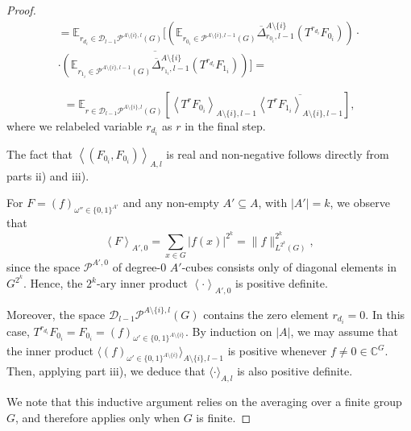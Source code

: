 \documentclass{amsart}
\theoremstyle{definition}
\theoremstyle{remark}
\numberwithin{equation}{section}
\begin{document}
\begin{proof}
\begin{multline*}
= \mathbb{E}_{r_{d_i} \in  \mathcal{D}_{l-1}\mathcal{P}^{A \setminus \{i\},l}(G) } \bigg[ \left(\mathbb{E}_{r_{0_i} \in  \mathcal{P}^{A \setminus \{i\},l-1}(G)} \overline{\Delta}^{A\setminus \{i\}}_{r_{0_i},l-1}\left( T^{r_{d_i}}F_{0_i}\right)\right) \cdot \\ \cdot
\overline{ \left(\mathbb{E}_{r_{1_i} \in  \mathcal{P}^{A \setminus \{i\},l-1}(G)}  \overline{\Delta}^{A\setminus \{i\}}_{r_{1_i},l-1}\left( T^{r_{d_i}}F_{1_i}\right)\right)} \bigg]=
\end{multline*}

$$=\mathbb{E}_{r \in \mathcal{D}_{l-1}\mathcal{P}^{A \setminus \{i\},l}(G)} \left[ \left\langle   T^{r}F_{0_i} \right\rangle_{A\setminus\{i\},l-1}  \overline{ \left\langle   T^{r}F_{1_i}  \right\rangle_{A\setminus\{i\},l-1}}\right],$$
where we relabeled variable $r_{d_i}$ as $r$ in the final step.


The fact that  $\left\langle \left(F_{0_i}, F_{0_i}\right) \right\rangle_{A,l}$ is real and non-negative follows directly from parts ii) and iii). 

For $F = \left( f \right)_{\omega'' \in \{0,1\} ^{A'}}$ and any non-empty $A'\subseteq A$, with $|A'|=k$, we observe that
$$\left\langle F \right\rangle_{A',0} = \sum_{x \in G} \left|f(x)\right|^{2^k}  =  \| f\|^{2^k}_{L^{2^k}(G)},$$ 
since the space $\mathcal{P}^{A',0}$ of degree-$0$ $A'$-cubes consists  only of diagonal elements in $G^{2^k}$. Hence, the $2^k$-ary inner product $\left\langle \cdot \right\rangle_{A',0}$ is positive definite.

Moreover, the space $\mathcal{D}_{l-1}\mathcal{P}^{A \setminus \{i\},l}(G)$ contains the zero element $r_{d_i}=0$. In this case,  $T^{r_{d_i}}F_{0_i} = F_{0_i} = \left( f\right)_{\omega' \in \{0,1\} ^{A\setminus\{i\}}}$. By induction on $|A|$, we may assume that the inner product 
$\langle \left( f\right)_{\omega' \in \{0,1\} ^{A\setminus\{i\}}} \rangle_{A\setminus\{i\},l-1}$ is positive whenever $f \neq 0 \in \mathbb{C}^G$. Then, applying part  iii), we deduce that  $\langle \cdot \rangle_{A,l}$ is also positive definite.

We note that this inductive argument relies on the averaging over a finite group $G$, and therefore applies only when $G$ is finite.  
\end{proof}
\end{document}

